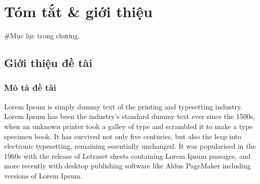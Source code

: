 \chapter{Tóm tắt \& giới thiệu}
\minitoc #Mục lục trong chương.
\newpage
\section{Giới thiệu đề tài}
\subsection{Mô tả đề tài}

Lorem Ipsum is simply dummy text of the printing and typesetting industry. Lorem Ipsum has been the industry's standard dummy text ever since the 1500s, when an unknown printer took a galley of type and scrambled it to make a type specimen book. It has survived not only five centuries, but also the leap into electronic typesetting, remaining essentially unchanged. It was popularised in the 1960s with the release of Letraset sheets containing Lorem Ipsum passages, and more recently with desktop publishing software like Aldus PageMaker including versions of Lorem Ipsum.
